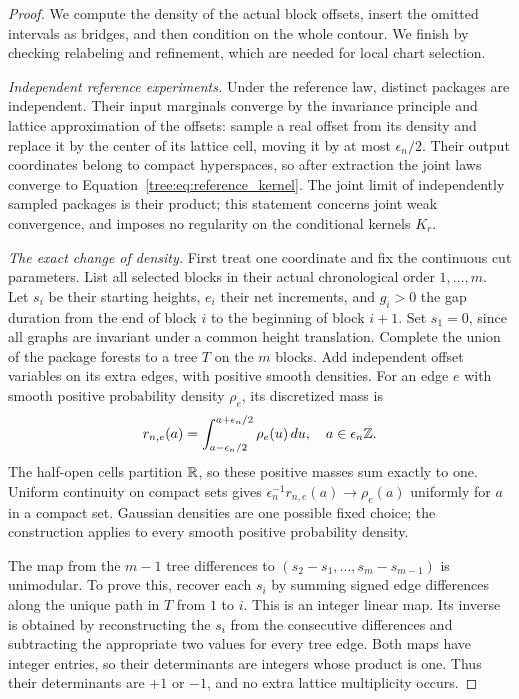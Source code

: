 \begin{proof}
We compute the density of the actual block offsets, insert the omitted
intervals as bridges, and then condition on the whole contour. We finish
by checking relabeling and refinement, which are needed for local chart
selection.

\emph{Independent reference experiments.} Under the
reference law, distinct packages are independent. Their input
marginals converge by the invariance principle and lattice
approximation of the offsets: sample a real offset from its density
and replace it by the center of its lattice cell, moving it by at most
$\epsilon_n/2$. Their output coordinates belong to
compact hyperspaces, so after extraction the joint laws converge to
Equation~\eqref{tree:eq:reference_kernel}.  The joint limit of independently
sampled packages is their product; this statement concerns joint weak
convergence, and imposes no regularity on the conditional kernels $K_r$.

\emph{The exact change of density.}
First treat one coordinate and fix the continuous cut parameters.
List all selected blocks in their actual chronological order
$1,\ldots,m$.  Let $s_i$ be their starting heights, $e_i$ their net
increments, and $g_i>0$ the gap duration from the end of block $i$ to
the beginning of block $i+1$.  Set $s_1=0$, since all graphs are
invariant under a common height translation.  Complete the union of
the package forests to a tree $T$ on the $m$ blocks.  Add independent
offset variables on its extra edges, with positive smooth densities.
For an edge $e$ with smooth positive probability density $\rho_e$,
its discretized mass is
\begin{equation}\label{tree:eq:offset_mass}
 r_{n,e}(a)=\int_{a-\epsilon_n/2}^{a+\epsilon_n/2}\rho_e(u)\,du,
 \quad a\in\epsilon_n\mathbb Z.
\end{equation}
The half-open cells partition $\mathbb R$, so these positive masses sum
exactly to one. Uniform continuity on compact sets gives
$\epsilon_n^{-1}r_{n,e}(a)\to\rho_e(a)$ uniformly for $a$ in a compact
set. Gaussian densities are one possible fixed choice; the construction
applies to every smooth positive probability density.

The map from the $m-1$ tree differences to
$(s_2-s_1,\ldots,s_m-s_{m-1})$ is unimodular.  To prove this, recover
each $s_i$ by summing signed edge differences along the unique path
in $T$ from $1$ to $i$.  This is an integer linear map.  Its inverse
is obtained by reconstructing the $s_i$ from the consecutive differences
and subtracting the appropriate two values for every tree edge.
Both maps have integer entries, so their determinants are integers
whose product is one.  Thus their determinants are $+1$ or $-1$,
and no extra lattice multiplicity occurs.


\end{proof}
